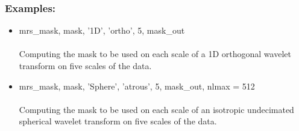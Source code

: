 \subsubsection*{Examples:} 
\begin{itemize}
\item  mrs\_mask, mask, '1D', 'ortho', 5, mask\_out\\\\
Computing the mask to be used on each scale of a 1D orthogonal wavelet transform on five scales of the data.
  
\item  mrs\_mask, mask, 'Sphere', 'atrous', 5, mask\_out, nlmax = 512\\\\
Computing the mask to be used on each scale of an isotropic undecimated spherical wavelet transform on five scales of the data. 
\end{itemize}



